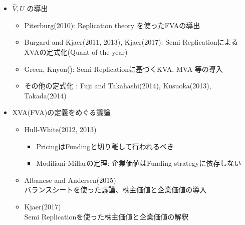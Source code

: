 \documentclass[driverfallback=dvipdfmx,cjk]{beamer}
\begin{document}
\begin{frame}
    \begin{itemize}
        \item $\hat{V}, U$ の導出
        \begin{itemize}
            \item Piterburg(2010):
            Replication theory を使ったFVAの導出
            \item Burgard and Kjaer(2011,  2013), Kjaer(2017):
            Semi-ReplicationによるXVAの定式化(Quant of the year)
            \item Green, Knyon():
            Semi-Replicationに基づくKVA, MVA 等の導入
            \item その他の定式化 : Fuji and Takahashi(2014), Kusuoka(2013), Takada(2014)
        \end{itemize}
        \item XVA(FVA)の定義をめぐる議論
        \begin{itemize}
            \item Hull-White(2012, 2013)
            \begin{itemize}
                \item PricingはFundingと切り離して行われるべき
                \item Modiliani-Millarの定理: 企業価値はFunding strategyに依存しない 
            \end{itemize}
            
            \item Albanese and Andersen(2015)\\
            バランスシートを使った議論、株主価値と企業価値の導入
            \item Kjaer(2017) \\
            Semi Replicationを使った株主価値と企業価値の解釈
        \end{itemize}
    \end{itemize}
\end{frame}
\end{document}
